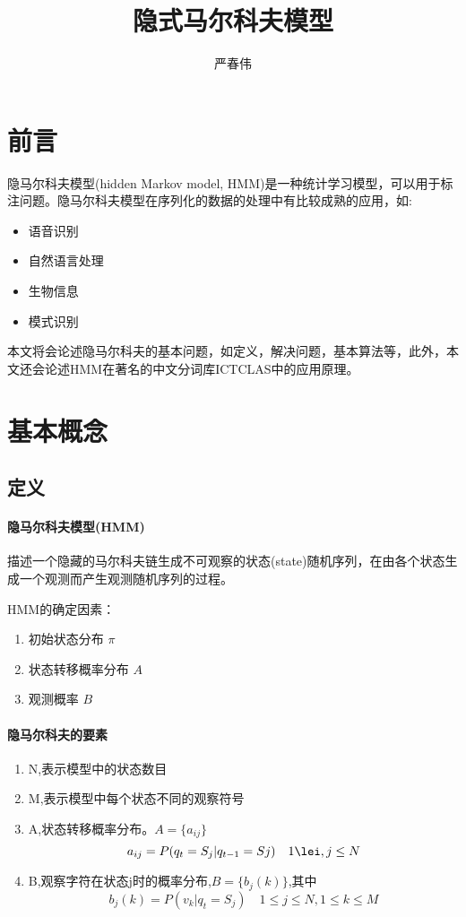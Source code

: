 \documentclass[a4paper]{ctexart}
\author{严春伟}
\title{隐式马尔科夫模型}
\begin{document}
    \maketitle

\section{前言}
\par 
隐马尔科夫模型(hidden Markov model, HMM)是一种统计学习模型，可以用于标注问题。隐马尔科夫模型在序列化的数据的处理中有比较成熟的应用，如:
\begin{itemize}
\item 语音识别
\item 自然语言处理
\item 生物信息
\item 模式识别
\end{itemize}
\par
本文将会论述隐马尔科夫的基本问题，如定义，解决问题，基本算法等，此外，本文还会论述HMM在著名的中文分词库ICTCLAS中的应用原理。

\section{基本概念}
\subsection{定义}
\paragraph{隐马尔科夫模型(HMM)} 描述一个隐藏的马尔科夫链生成不可观察的状态(state)随机序列，在由各个状态生成一个观测而产生观测随机序列的过程。
\par
HMM的确定因素：
\begin{enumerate}
\item 初始状态分布 $\pi$
\item 状态转移概率分布 $A$
\item 观测概率 $B$
\end{enumerate}

\paragraph{隐马尔科夫的要素}
\begin{enumerate}
\item N,表示模型中的状态数目
\item M,表示模型中每个状态不同的观察符号
\item A,状态转移概率分布。$A=\{a_{ij}\}$
    \begin{equation}
    a_{ij} = P(q_t = S_j | q_{t-1} = Sj) \quad 1\lei, j\le N     
    \end{equation}
\item B,观察字符在状态j时的概率分布,$B=\{b_j(k)\}$,其中
    \begin{equation}
    b_j(k) = P(v_k|q_t = S_j) \quad 1\le j \le N, 1 \le k \le M
    \end{equation}
\end{enumerate}
\end{document}
